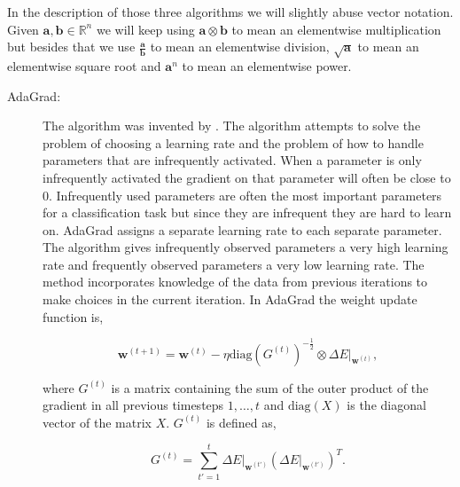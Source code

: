 In the description of those three algorithms we will slightly abuse vector
notation. Given $\mathbf{a}, \mathbf{b} \in \mathbb{R}^n$ we will keep using
$\mathbf{a} \otimes \mathbf{b}$ to mean an elementwise multiplication but
besides that we use $\frac{\mathbf{a}}{\mathbf{b}}$ to mean an elementwise
division, $\sqrt{\mathbf{a}}$ to mean an elementwise square root and
$\mathbf{a}^n$ to mean an elementwise power.

\begin{description}

    \item[\gls{AdaGrad}:]

        The algorithm was invented by \citet{Duchi:2011:ASM:1953048.2021068}.
        The algorithm attempts to solve the problem of choosing a learning
        rate and the problem of how to handle parameters that are infrequently
        activated. When a parameter is only infrequently activated the gradient
        on that parameter will often be close to 0. Infrequently used parameters
        are often the most important parameters for a classification task but
        since they are infrequent they are hard to learn on. \gls{AdaGrad}
        assigns a separate learning rate to each separate parameter. The
        algorithm gives infrequently observed parameters a very high learning
        rate and frequently observed parameters a very low learning rate. The
        method incorporates knowledge of the data from previous iterations to
        make choices in the current iteration. In \gls{AdaGrad} the weight
        update function is,

        \begin{equation}
            \mathbf{w}^{(t+1)} =
                \mathbf{w}^{(t)} -
                \eta \text{diag}\left(G^{(t)}\right)^{-\frac{1}{2}} \otimes
                \Delta E|_{\mathbf{w}^{(t)}},
        \end{equation}

        where $G^{(t)}$ is a matrix containing the sum of the outer product
        of the gradient in all previous timesteps $1, \dots, t$ and
        $\text{diag}(X)$ is the diagonal vector of the matrix $X$. $G^{(t)}$ is
        defined as,

        \begin{equation}
            G^{(t)} = \sum_{t'=1}^t \Delta E|_{\mathbf{w}^{(t')}}
                \left(
                    \Delta E|_{\mathbf{w}^{(t')}}
                \right)^T.
        \end{equation}


\end{description}
